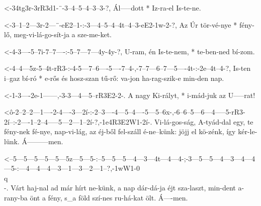   {<-34tg3r-3rR3d1-¨-3--4--5--4--3--3-?,}
  {  Ál-----dott   * Iz-ra-el Is-te-ne.}


  {<-3--1--2---3r-2---¨-eE2--1-:-3---4--5--4--4t--4--3-eE2-1w-2-?,}
  {  Az Úr tör-vé-nye * fény-lő, meg-vi-lá-go-sít-ja a sze-me-ket.}

  {<-4-3----5--7i-7--7----:-5--7---7---4y-4y-?,}
  {  U-ram, én Is-te-nem, * te-ben-ned bí-zom.}

  {<-4--4---5z-5--4t-rR3-:-4-5---7--6----5----7--4-,-7--7---6--7---5----4t-:-2e--4t--4-?,}
  {  Is-ten i--gaz bí-ró * e-rős és hosz-szan tű-rő: va-jon ha-rag-szik-e    min-den nap.}



  {<-1-3----2e-1------,-3-3---4---5--rR3E2-2-.}
  {A nagy Ki-rályt, * i-mád-juk az U-----rat!}


  {<ô-2--2--2---1----2-4----3---2í-:-2--3----4---5--4----5---5--6x-,-6--6--5---6---4-----5-rR3-2í--:-2----1--2--4-----5---2---1--2í-?,-1e4R3E2W1-2í-.}
  {   Vi-lá-gos-ság, A-tyád-dal egy, te fény-nek fé-nye, nap-vi-lág, az éj-ből fel-száll é-ne--künk: jöjj el kö-zénk, így kér-le-lünk. Á---------men.}


  {<--5---5---5---5---5---5z---5---5-:--5---5---5---4---3---4t---4---4-;-3---5---5---4---3---4---4---5-:---4---4---4---3---1---3---2---1--?,-1wW1-0\\q\\-.}
  {   Várt haj-nal ad már hírt ne-künk, a nap dár-dá-ja éjt sza-laszt, min-dent a-rany-ba önt a fény, s_a föld szí-nes ru-há-kat ölt.        Á----men.}


